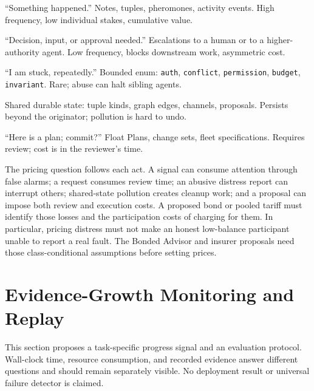 \documentclass[11pt,a4paper]{article}
\theoremstyle{definition}
\theoremstyle{remark}
\begin{document}
\begin{description}[nosep]
  \item[Signal.] ``Something happened.'' Notes, tuples, pheromones, activity events. High frequency, low individual stakes, cumulative value.
  \item[Request.] ``Decision, input, or approval needed.'' Escalations to a human or to a higher-authority agent. Low frequency, blocks downstream work, asymmetric cost.
  \item[Distress.] ``I am stuck, repeatedly.'' Bounded enum: \texttt{auth}, \texttt{conflict}, \texttt{permission}, \texttt{budget}, \texttt{invariant}. Rare; abuse can halt sibling agents.
  \item[Commons.] Shared durable state: tuple kinds, graph edges, channels, proposals. Persists beyond the originator; pollution is hard to undo.
  \item[Proposal.] ``Here is a plan; commit?'' Float Plans, change sets, fleet specifications. Requires review; cost is in the reviewer's time.
\end{description}

The pricing question follows each act. A signal can consume attention through
false alarms; a request consumes review time; an abusive distress report can
interrupt others; shared-state pollution creates cleanup work; and a proposal
can impose both review and execution costs. A proposed bond or pooled tariff
must identify those losses and the participation costs of charging for them.
In particular, pricing distress must not make an honest low-balance participant
unable to report a real fault. The Bonded Advisor and insurer proposals need
those class-conditional assumptions before setting prices.

\ifdefined\pdswisslandmarkplate
\begin{figure}[p]
  \centering
\end{figure}
\pdmarginpagebreak
\fi

\section{Evidence-Growth Monitoring and Replay}\label{sec:vibe}

This section proposes a task-specific progress signal and an evaluation protocol.
Wall-clock time, resource consumption, and recorded evidence answer different
questions and should remain separately visible. No deployment result or universal
failure detector is claimed.
\end{document}
